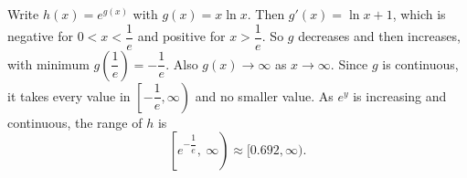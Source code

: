 Write $h(x)=e^{g(x)}$ with $g(x)=x\ln x$. Then $g'(x)=\ln x+1$, which is negative for $0<x<\dfrac1e$ and positive for $x>\dfrac1e$. So $g$ decreases and then increases, with minimum $g\left(\dfrac1e\right)=-\dfrac1e$. Also $g(x)\to\infty$ as $x\to\infty$. Since $g$ is continuous, it takes every value in $\left[-\dfrac1e,\infty\right)$ and no smaller value. As $e^y$ is increasing and continuous, the range of $h$ is
\[\boxed{\left[e^{-\dfrac1e},\ \infty\right)}\approx[0.692,\infty).\]
